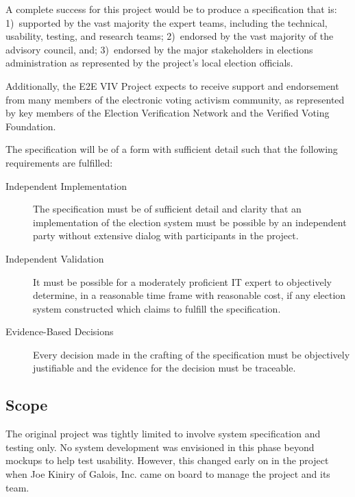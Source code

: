 A complete success for this project would be to produce a
specification that is: 1)~supported by the vast majority the expert
teams, including the technical, usability, testing, and research
teams; 2)~endorsed by the vast majority of the advisory council, and;
3)~endorsed by the major stakeholders in elections administration as
represented by the project's local election officials.

Additionally, the E2E VIV Project expects to receive support and
endorsement from many members of the electronic voting activism
community, as represented by key members of the Election Verification
Network and the Verified Voting Foundation.

The specification will be of a form with sufficient detail such that
the following requirements are fulfilled:
\begin{description}
\item[Independent Implementation] The specification must be of
  sufficient detail and clarity that an implementation of the election
  system must be possible by an independent party without extensive
  dialog with participants in the project.
\item[Independent Validation] It must be possible for a moderately
  proficient IT expert to objectively determine, in a reasonable time
  frame with reasonable cost, if any election system constructed which
  claims to fulfill the specification.
\item[Evidence-Based Decisions] Every decision made in the crafting of
  the specification must be objectively justifiable and the evidence
  for the decision must be traceable.
\end{description}

\subsection{Scope}
\label{sec:scope}

The original project was tightly limited to involve system
specification and testing only. No system development was envisioned
in this phase beyond mockups to help test usability. However, this
changed early on in the project when Joe Kiniry of Galois, Inc. came
on board to manage the project and its team.

